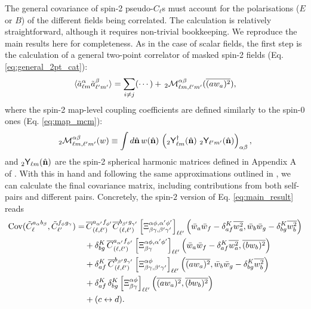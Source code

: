 \documentclass[%
 reprint,
superscriptaddress,
nofootinbib,
 amsmath,amssymb,
 aps,
 prd,
]{revtex4-2}
\newcommand{\nv}{\hat{\bf n}}
\begin{document}
  The general covariance of spin-2 pseudo-$C_\ell$s must account for the polarisations ($E$ or $B$) of the different fields being correlated. The calculation is relatively straightforward, although it requires non-trivial bookkeeping. We reproduce the main results here for completeness.  As in the case of scalar fields, the first step is the calculation of a general two-point correlator of masked spin-2 fields (Eq. \ref{eq:general_2pt_cat}):
  \begin{equation}
    \langle\tilde{a}^\alpha_{\ell m}\tilde{a}^\beta_{\ell'm'}\rangle=\sum_{i\neq j}(\cdots)+\,_2{\cal M}^{\alpha\beta}_{\ell m,\ell'm'}(\overline{(aw_a)^2}),
  \end{equation}
  where the spin-2 map-level coupling coefficients are defined similarly to the spin-0 ones (Eq. \ref{eq:map_mcm}):
  \begin{equation}
    _2{\cal M}^{\alpha\beta}_{\ell m,\ell'm'}(w)\equiv\int d\nv\,w(\nv)\,\left(_2{\sf Y}^\dagger_{\ell m}(\nv)\,\,_2{\sf Y}_{\ell'm'}(\nv)\right)_{\alpha\beta},
  \end{equation}
  and $_2{\sf Y}_{\ell m}(\nv)$ are the spin-2 spherical harmonic matrices defined in Appendix A of \cite{1809.09603}. With this in hand and following the same approximations outlined in \cite{1906.11765}, we can calculate the final covariance matrix, including contributions from both self-pairs and different pairs. Concretely, the spin-$2$ version of Eq. \ref{eq:main_result} reads
  \begin{align}
    {\rm Cov}(\tilde{C}^{a_\alpha b_\beta}_\ell,\tilde{C}^{f_\phi g_\gamma}_{\ell'})=&\,\overline{C}^{a_{\alpha'}f_{\phi'}}_{(\ell,\ell')}\overline{C}^{b_{\beta'}g_{\gamma'}}_{(\ell,\ell')}\left[\Xi^{\alpha\phi,\alpha'\phi'}_{\beta\gamma,\beta'\gamma'}\right]_{\ell\ell'}\left(\bar{w}_a\bar{w}_f-\delta^K_{af}\overline{w_a^2},\bar{w}_b\bar{w}_g-\delta^K_{bg}\overline{w_b^2}\right)\\
    &+\delta^K_{bg}\,\overline{C}^{a_{\alpha'}f_{\phi'}}_{(\ell,\ell')}\left[\Xi^{\alpha\phi,\alpha'\phi'}_{\beta\gamma}\right]_{\ell\ell'}\left(\bar{w}_a\bar{w}_f-\delta^K_{af}\overline{w_a^2},\overline{(bw_b)^2}\right)\\
    &+\delta^K_{af}\,\overline{C}^{b_{\beta'}g_{\gamma'}}_{(\ell,\ell')}\left[\Xi^{\alpha\phi}_{\beta\gamma,\beta'\gamma'}\right]_{\ell\ell'}\left(\overline{(aw_a)^2},\bar{w}_b\bar{w}_g-\delta^K_{bg}\overline{w_b^2}\right)\\
    &+\delta^K_{af}\,\delta^K_{bg}\left[\Xi^{\alpha\phi}_{\beta\gamma}\right]_{\ell\ell'}\left(\overline{(aw_a)^2},\overline{(bw_b)^2}\right)\\\nonumber
      &+(c\leftrightarrow d).
  \end{align}
\end{document}

